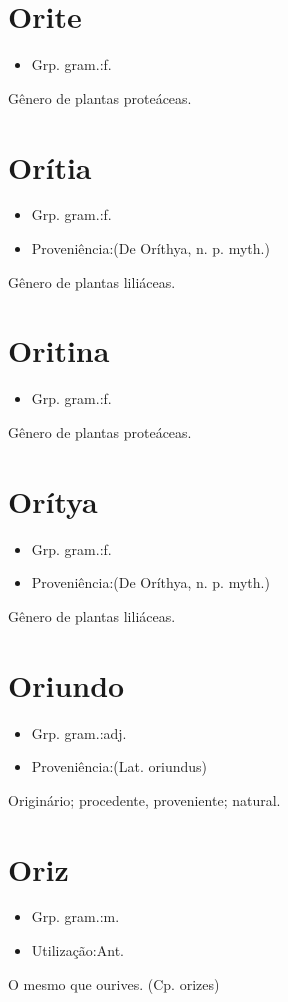 \section{Orite}
\begin{itemize}
\item {Grp. gram.:f.}
\end{itemize}
Gênero de plantas proteáceas.
\section{Orítia}
\begin{itemize}
\item {Grp. gram.:f.}
\end{itemize}
\begin{itemize}
\item {Proveniência:(De \textunderscore Oríthya\textunderscore , n. p. myth.)}
\end{itemize}
Gênero de plantas liliáceas.
\section{Oritina}
\begin{itemize}
\item {Grp. gram.:f.}
\end{itemize}
Gênero de plantas proteáceas.
\section{Orítya}
\begin{itemize}
\item {Grp. gram.:f.}
\end{itemize}
\begin{itemize}
\item {Proveniência:(De \textunderscore Oríthya\textunderscore , n. p. myth.)}
\end{itemize}
Gênero de plantas liliáceas.
\section{Oriundo}
\begin{itemize}
\item {Grp. gram.:adj.}
\end{itemize}
\begin{itemize}
\item {Proveniência:(Lat. \textunderscore oriundus\textunderscore )}
\end{itemize}
Originário; procedente, proveniente; natural.
\section{Oriz}
\begin{itemize}
\item {Grp. gram.:m.}
\end{itemize}
\begin{itemize}
\item {Utilização:Ant.}
\end{itemize}
O mesmo que \textunderscore ourives\textunderscore .
(Cp. \textunderscore orizes\textunderscore )
